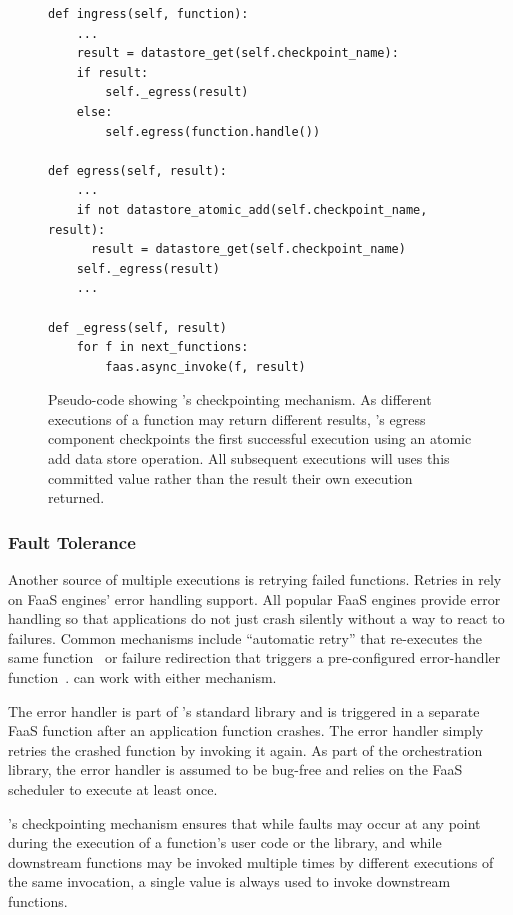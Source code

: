 \begin{figure}
\begin{verbatim}
def ingress(self, function):
    ...
    result = datastore_get(self.checkpoint_name):
    if result:
        self._egress(result)
    else:
        self.egress(function.handle())

def egress(self, result):
    ...
    if not datastore_atomic_add(self.checkpoint_name, result):
      result = datastore_get(self.checkpoint_name)
    self._egress(result)
    ...

def _egress(self, result)
    for f in next_functions:
        faas.async_invoke(f, result)
\end{verbatim}
\caption{Pseudo-code showing \name{}'s checkpointing mechanism. As different
executions of a function may return different results, \name{}'s egress
component checkpoints the first successful execution using an atomic add
data store operation. All subsequent executions will uses this committed value
rather than the result their own execution returned.}
\label{fig:design:checkpoint}
\end{figure}

\subsubsection{Fault Tolerance}

Another source of multiple executions is retrying failed functions. Retries in
\name{} rely on FaaS engines' error handling support. All popular FaaS engines
provide error handling so that applications do not just crash silently without
a way to react to failures. Common mechanisms include ``automatic retry'' that
re-executes the same function~\cite{aws-lambda-retry, azure-functions-retry,
google-cloud-functions-retry, openfaas-retry} or failure redirection that
triggers a pre-configured error-handler
function~\cite{aws-lambda-failure-destination,
openwhisk-action-error-handling}. \name{} can work with either mechanism.

The \name{} error handler is part of \name{}'s standard library and is
triggered in a separate FaaS function after an application function crashes.
The error handler simply retries the crashed function by invoking it again. As
part of the orchestration library, the error handler is assumed to be bug-free
and relies on the FaaS scheduler to execute at least once.

\name{}'s checkpointing mechanism ensures that while faults may occur at any
point during the execution of a function's user code or the \name{} library,
and while downstream functions may be invoked multiple times by different
executions of the same invocation, a single value is always used to invoke
downstream functions.

